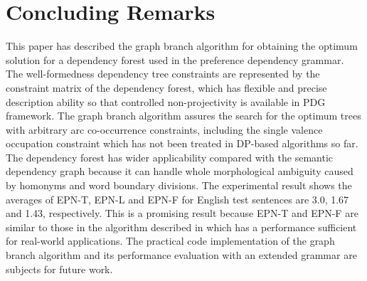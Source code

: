 \section{Concluding Remarks}

This paper has described the graph branch algorithm for obtaining the
optimum solution for a dependency forest used in the preference
dependency grammar. The well-formedness dependency tree constraints
are represented by the constraint matrix of the dependency forest,
which has flexible and precise description ability so that controlled
non-projectivity is available in PDG framework. The graph branch
algorithm assures the search for the optimum trees with arbitrary arc
co-occurrence constraints, including the single valence occupation
constraint which has not been treated in DP-based algorithms so
far. The dependency forest has wider applicability compared with the
semantic dependency graph because it can handle whole morphological
ambiguity caused by homonyms and word boundary divisions. The
experimental result shows the averages of EPN-T, EPN-L and EPN-F for
English test sentences are 3.0, 1.67 and 1.43, respectively. This
is a promising result because EPN-T and EPN-F are similar to
those in the algorithm described in \cite{Hirakawa01} which 
has a performance sufficient for real-world applications. The
practical code implementation of the graph branch algorithm and its
performance evaluation with an extended grammar are subjects for
future work.




